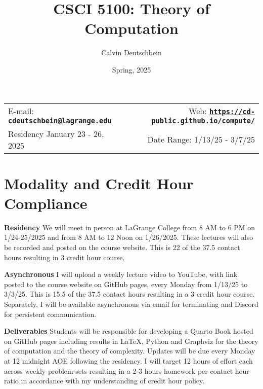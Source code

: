 \documentclass[11pt]{article}
\title{CSCI 5100: Theory of Computation}
\author{Calvin Deutschbein}
\date{Spring, 2025}
\newcommand{\blankline}{\quad\pagebreak[2]}
\begin{document}
\maketitle

\blankline

\begin{tabular*}{.93\textwidth}{@{\extracolsep{\fill}}lr}


E-mail: \href{mailto:cdeutschbein@lagrange.edu}{\tt\bf cdeutschbein@lagrange.edu} & Web: \href{https://cd-public.github.io/compute/}{\tt\bf https://cd-public.github.io/compute/}  \\

Residency January 23 - 26, 2025  &  Date Range: 1/13/25 - 3/7/25 \\
\hline
\end{tabular*}

\vspace{5 mm}


\section*{Modality and Credit Hour Compliance}

\textbf{Residency} We will meet in person at LaGrange College from 8 AM to 6 PM on 1/24-25/2025 and from 8 AM to 12 Noon on 1/26/2025. These lectures will also be recorded and posted on the course website. This is 22 of the 37.5 contact hours resulting in 3 credit hour course.

\bigskip

\textbf{Asynchronous} I will upload a weekly lecture video to YouTube, with link posted to the course website on GitHub pages, every Monday from 1/13/25 to 3/3/25. This is 15.5 of the 37.5 contact hours resulting in a 3 credit hour course.  Separately, I will be available asynchronous via email for terminating and Discord for persistent communication.

\bigskip

\textbf{Deliverables} Students will be responsible for developing a Quarto Book hosted on GitHub pages including results in LaTeX, Python and Graphviz for the theory of computation and the theory of complexity. Updates will be due every Monday at 12 midnight AOE following the residency. I will target 12 hours of effort each across weekly problem sets resulting in a 2-3 hours homework per contact hour ratio in accordance with my understanding of credit hour policy.
\end{document}

